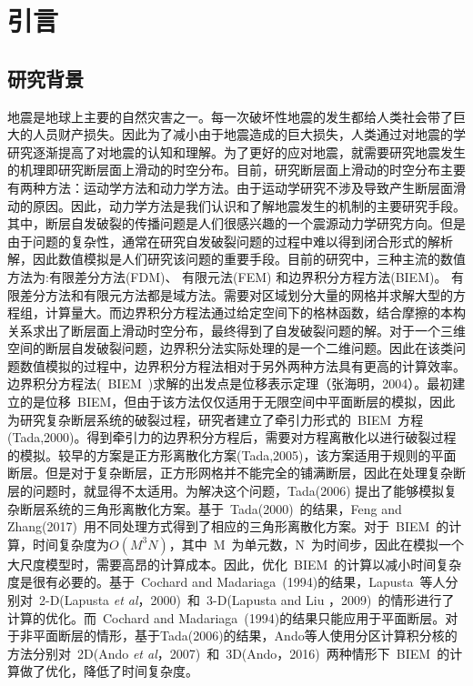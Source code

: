 
\chapter{引言}
	\section{研究背景}
	\indent 地震是地球上主要的自然灾害之一。每一次破坏性地震的发生都给人类社会带了巨大的人员财产损失。因此为了减小由于地震造成的巨大损失，人类通过对地震的学研究逐渐提高了对地震的认知和理解。为了更好的应对地震，就需要研究地震发生的机理即研究断层面上滑动的时空分布。目前，研究断层面上滑动的时空分布主要有两种方法：运动学方法和动力学方法。由于运动学研究不涉及导致产生断层面滑动的原因。因此，动力学方法是我们认识和了解地震发生的机制的主要研究手段。其中，断层自发破裂的传播问题是人们很感兴趣的一个震源动力学研究方向。但是由于问题的复杂性，通常在研究自发破裂问题的过程中难以得到闭合形式的解析解，因此数值模拟是人们研究该问题的重要手段。目前的研究中，三种主流的数值方法为:有限差分方法(FDM)、 有限元法(FEM) 和边界积分方程方法(BIEM)。 有限差分方法和有限元方法都是域方法。需要对区域划分大量的网格并求解大型的方程组，计算量大。而边界积分方程法通过给定空间下的格林函数，结合摩擦的本构关系求出了断层面上滑动时空分布，最终得到了自发破裂问题的解。对于一个三维空间的断层自发破裂问题，边界积分法实际处理的是一个二维问题。因此在该类问题数值模拟的过程中，边界积分方程法相对于另外两种方法具有更高的计算效率。\\
 \indent 边界积分方程法(~BIEM~)求解的出发点是位移表示定理（张海明，2004）。最初建立的是位移~BIEM，但由于该方法仅仅适用于无限空间中平面断层的模拟，因此为研究复杂断层系统的破裂过程，研究者建立了牵引力形式的~BIEM~方程(Tada,2000)。得到牵引力的边界积分方程后，需要对方程离散化以进行破裂过程的模拟。较早的方案是正方形离散化方案(Tada,2005)，该方案适用于规则的平面断层。但是对于复杂断层，正方形网格并不能完全的铺满断层，因此在处理复杂断层的问题时，就显得不太适用。为解决这个问题，Tada(2006) 提出了能够模拟复杂断层系统的三角形离散化方案。基于~Tada(2000)~的结果，Feng and Zhang(2017)~用不同处理方式得到了相应的三角形离散化方案。对于~BIEM~的计算，时间复杂度为$O(M^{3}N)$，其中~M~为单元数，N~为时间步，因此在模拟一个大尺度模型时，需要高昂的计算成本。因此，优化~BIEM~的计算以减小时间复杂度是很有必要的。基于~Cochard and Madariaga~(1994)的结果，Lapusta~等人分别对~2-D(Lapusta \emph{et al}，2000)~和~3-D(Lapusta and Liu ，2009)~的情形进行了计算的优化。而~Cochard and Madariaga~(1994)的结果只能应用于平面断层。对于非平面断层的情形，基于Tada(2006)的结果，Ando等人使用分区计算积分核的方法分别对~2D(Ando \emph{et al}，2007)~和~3D(Ando，2016)~两种情形下~BIEM~的计算做了优化，降低了时间复杂度。

